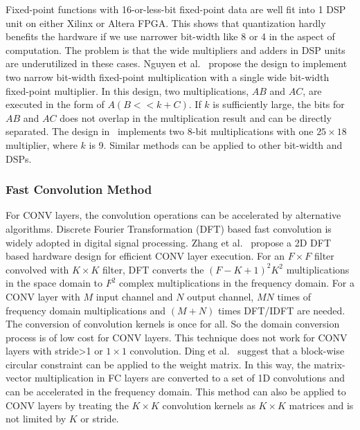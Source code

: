 Fixed-point functions with 16-or-less-bit fixed-point data are well fit into 1 DSP unit on either Xilinx or Altera FPGA. This shows that quantization hardly benefits the hardware if we use narrower bit-width like 8 or 4 in the aspect of computation. The problem is that the wide multipliers and adders in DSP units are underutilized in these cases. Nguyen et al.~\cite{nguyen2017double} propose the design to implement two narrow bit-width fixed-point multiplication with a single wide bit-width fixed-point multiplier. In this design, two multiplications, $AB$ and $AC$, are executed in the form of $A(B<<k+C)$. If $k$ is sufficiently large, the bits for $AB$ and $AC$ does not overlap in the multiplication result and can be directly separated. The design in~\cite{nguyen2017double} implements two 8-bit multiplications with one $25\times 18$ multiplier, where $k$ is 9. Similar methods can be applied to other bit-width and DSPs.




\subsubsection{Fast Convolution Method}\label{sec:hardware:cu:fcu}
For CONV layers, the convolution operations can be accelerated by alternative algorithms. Discrete Fourier Transformation (DFT) based fast convolution is widely adopted in digital signal processing. Zhang et al.~\cite{zhang2017frequency} propose a 2D DFT based hardware design for efficient CONV layer execution. For an $F\times F$ filter convolved with $K\times K$ filter, DFT converts the $(F-K+1)^2K^2$ multiplications in the space domain to $F^2$ complex multiplications in the frequency domain. For a CONV layer with $M$ input channel and $N$ output channel, $MN$ times of frequency domain multiplications and $(M+N)$ times DFT/IDFT are needed. The conversion of convolution kernels is once for all. So the domain conversion process is of low cost for CONV layers. This technique does not work for CONV layers with stride>1 or $1\times 1$ convolution. Ding et al.~\cite{ding2017c} suggest that a block-wise circular constraint can be applied to the weight matrix. In this way, the matrix-vector multiplication in FC layers are converted to a set of 1D convolutions and can be accelerated in the frequency domain. This method can also be applied to CONV layers by treating the $K\times K$ convolution kernels as $K\times K$ matrices and is not limited by $K$ or stride.

